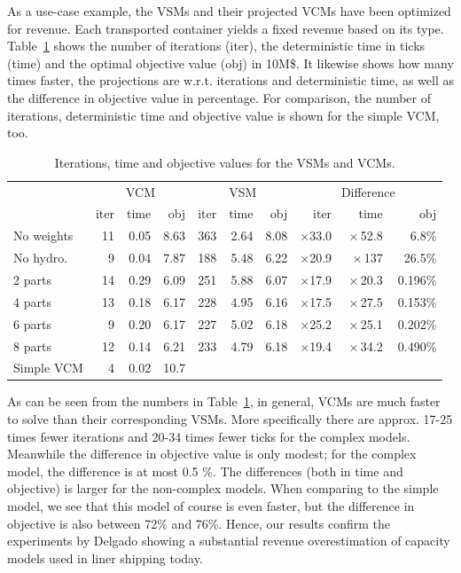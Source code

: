\documentclass{llncs}
\newcommand{\btablesize}{\begin{scriptsize}}
\newcommand{\etablesize}{\end{scriptsize}}
\begin{document}
As a use-case example, the VSMs and their projected VCMs have been optimized for revenue. Each transported container yields a fixed revenue based on its type. 
Table~\ref{tab:usingProjections} shows the number of iterations (iter), the deterministic time in ticks (time) and the optimal objective value (obj) in 10M\$. It likewise shows how many times faster, the projections are w.r.t. iterations and deterministic time, as well as the difference in objective value in percentage. For comparison, the number of iterations, deterministic time and objective value is shown for the simple VCM, too.
\begin{table}[tb]
\caption{Iterations, time and objective values for the VSMs and VCMs.}
\label{tab:usingProjections}
\centering
\btablesize
\begin{tabular}{l|r@{\:\;}r@{\:\;}r|r@{\:\;}r@{\:\:\:}r|rrr}
&\multicolumn{3}{c|}{VCM}&\multicolumn{3}{c|}{VSM}&\multicolumn{3}{c}{Difference}\\
						&iter&time  &obj 	 &iter  &time  &obj	&iter 			 &time					&obj\\ 
\hline
No weights	&	11 & 0.05 & 8.63 &	363 & 2.64 &8.08&$\times$33.0&$\:\times$52.8&$\:$6.8$\%$\\
No hydro. 	&  9 & 0.04 & 7.87 &	188 & 5.48 &6.22&$\times$20.9&$\:\times$137 &$\:$26.5$\%$\\
2 parts			& 14 & 0.29 & 6.09 &	251 & 5.88 &6.07&$\times$17.9&$\:\times$20.3&$\:$0.196$\%$\\
4 parts		 	& 13 & 0.18 & 6.17 &  228 & 4.95 &6.16&$\times$17.5&$\:\times$27.5&$\:$0.153$\%$\\
6 parts		 	&  9 & 0.20 & 6.17 &  227 & 5.02 &6.18&$\times$25.2&$\:\times$25.1&$\:$0.202$\%$\\
8 parts		 	& 12 & 0.14 & 6.21 &  233 & 4.79 &6.18&$\times$19.4&$\:\times$34.2&$\:$0.490$\%$\\
\bottomrule
Simple VCM&  4 & 0.02 &10.7\phantom{0}\\
\end{tabular}
\etablesize
\end{table}
As can be seen from the numbers in Table~\ref{tab:usingProjections}, in general, VCMs are much faster to solve than their corresponding VSMs. More specifically there are approx. 17-25 times fewer iterations and 20-34 times fewer ticks for the complex models. 
Meanwhile the difference in objective value is only modest; for the complex model, the difference is at most 0.5 \%. 
The differences (both in time and objective) is larger for the non-complex models.
When comparing to the simple model, we see that this model of course is even faster, but the difference in objective is also between 72\% and 76\%. 
Hence, our results confirm the experiments by Delgado \cite{AlbertosThesis} showing a substantial revenue overestimation of capacity models used in liner shipping today. \\
\end{document}

